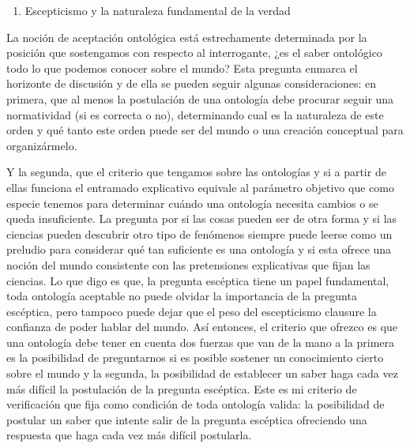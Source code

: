 \documentclass[]{book}
\begin{document}
\begin{refsection}
\begin{enumerate}
\def\labelenumi{\arabic{enumi}.}
\item
  Escepticismo y la naturaleza fundamental de la verdad
\end{enumerate}

La noción de aceptación ontológica está estrechamente determinada por la
posición que sostengamos con respecto al interrogante, ¿es el saber
ontológico todo lo que podemos conocer sobre el mundo? Esta pregunta
enmarca el horizonte de discusión y de ella se pueden seguir algunas
consideraciones: en primera, que al menos la postulación de una
ontología debe procurar seguir una normatividad (si es correcta o no),
determinando cual es la naturaleza de este orden y qué tanto este orden
puede ser del mundo o una creación conceptual para organizármelo.

Y la segunda, que el criterio que tengamos sobre las ontologías y si a
partir de ellas funciona el entramado explicativo equivale al parámetro
objetivo que como especie tenemos para determinar cuándo una ontología
necesita cambios o se queda insuficiente. La pregunta por si las cosas
pueden ser de otra forma y si las ciencias pueden descubrir otro tipo de
fenómenos siempre puede leerse como un preludio para considerar qué tan
suficiente es una ontología y si esta ofrece una noción del mundo
consistente con las pretensiones explicativas que fijan las ciencias. Lo
que digo es que, la pregunta escéptica tiene un papel fundamental, toda
ontología aceptable no puede olvidar la importancia de la pregunta
escéptica, pero tampoco puede dejar que el peso del escepticismo
clausure la confianza de poder hablar del mundo. Así entonces, el
criterio que ofrezco es que una ontología debe tener en cuenta dos
fuerzas que van de la mano a la primera es la posibilidad de
preguntarnos si es posible sostener un conocimiento cierto sobre el
mundo y la segunda, la posibilidad de establecer un saber haga cada vez
más difícil la postulación de la pregunta escéptica. Este es mi criterio
de verificación que fija como condición de toda ontología valida: la
posibilidad de postular un saber que intente salir de la pregunta
escéptica ofreciendo una respuesta que haga cada vez más difícil
postularla.

\nocite{Aristoteles1994}
\nocite{Canamares2005}
\nocite{Putnam2005}
\nocite{Quine1968}
\nocite{Quine1985}

\printbibliography[heading=subbibliography,title={Referencias}]

\end{refsection}
\end{document}
